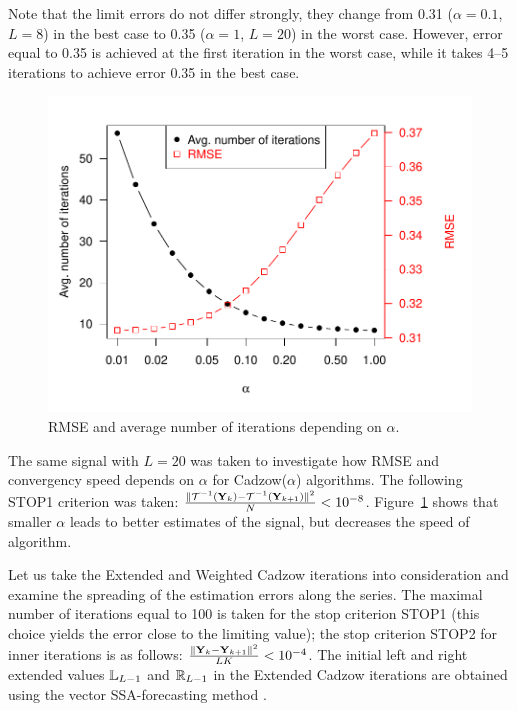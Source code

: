 \documentclass[sii]{ipart}
\begin{document}
Note that the limit errors do not differ strongly, they change from 0.31 ($\alpha=0.1$, $L=8$) in the best case to 0.35 ($\alpha=1$, $L=20$) in the worst case. However, error equal to 0.35 is achieved at the first iteration in the worst case, while it takes 4--5 iterations to achieve error 0.35 in the best case.

\smallskip
\begin{figure}[!hhh]
	\includegraphics[width = \columnwidth]{2axis.pdf}
	\caption{RMSE and average number of iterations depending on $\alpha$.}
	\label{img_2axis}
\end{figure}
The same signal with $L = 20$ was taken to investigate how RMSE and convergency speed depends on $\alpha$ for Cadzow($\alpha$) algorithms. The following STOP1 criterion was taken: $\frac{\|\mathcal{T}^{-1}(\mathbf{Y}_k) - \mathcal{T}^{-1}(\mathbf{Y}_{k + 1})\|^2}{N} < 10^{-8}$. Figure~\ref{img_2axis} shows that smaller $\alpha$ leads to better estimates of the signal, but decreases the speed of algorithm.

\smallskip
Let us take the Extended and Weighted Cadzow iterations into consideration and examine the spreading of the estimation errors along the series. The maximal number of iterations equal to 100 is taken for the stop criterion STOP1 (this choice yields the error close to the limiting value); the stop criterion STOP2 for inner iterations is as follows:
$\frac{\|\mathbf{Y}_k - \mathbf{Y}_{k+1}\|^2}{LK} < 10^{-4}$. The initial left and right extended values $\mathbb{L}_{L-1}$ and $\mathbb{R}_{L-1}$ in the Extended Cadzow iterations are obtained using the vector SSA-forecasting method \cite[chapter 2.3.1]{Golyandina.etal2001}.
\end{document}
